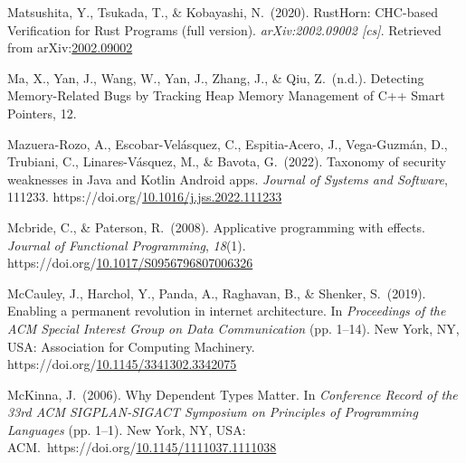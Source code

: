 \documentclass[12pt,twoside]{article}
\begin{document}
{\begin{thebibliography}{1079}
\mdbibitemlabel{}Matsushita, Y., Tsukada, T., \& Kobayashi, N.~(2020). RustHorn: CHC-based Verification for Rust Programs (full version). \emph{arXiv:2002.09002 {}[cs]}. Retrieved from arXiv:\href{http://arxiv.org/abs/2002.09002}{2002.09002}%

\mdbibitemlabel{}Ma, X., Yan, J., Wang, W., Yan, J., Zhang, J., \& Qiu, Z.~(n.d.). Detecting Memory-Related Bugs by Tracking Heap Memory Management of C++ Smart Pointers, 12.%

\mdbibitemlabel{}Mazuera-Rozo, A., Escobar-Velásquez, C., Espitia-Acero, J., Vega-Guzmán, D., Trubiani, C., Linares-Vásquez, M., \& Bavota, G.~(2022). Taxonomy of security weaknesses in Java and Kotlin Android apps. \emph{Journal of Systems and Software}, 111233. https://doi.org/\href{https://dx.doi.org/10.1016/j.jss.2022.111233}{10.1016/j.jss.2022.111233}%

\mdbibitemlabel{}Mcbride, C., \& Paterson, R.~(2008). Applicative programming with effects. \emph{Journal of Functional Programming}, \emph{18}(1). https://doi.org/\href{https://dx.doi.org/10.1017/S0956796807006326}{10.1017/S0956796807006326}%

\mdbibitemlabel{}McCauley, J., Harchol, Y., Panda, A., Raghavan, B., \& Shenker, S.~(2019). Enabling a permanent revolution in internet architecture. In \emph{Proceedings of the ACM Special Interest Group on Data Communication} (pp. 1–14). New York, NY, USA: Association for Computing Machinery. https://doi.org/\href{https://dx.doi.org/10.1145/3341302.3342075}{10.1145/3341302.3342075}%

\mdbibitemlabel{}McKinna, J.~(2006). Why Dependent Types Matter. In \emph{Conference Record of the 33rd ACM SIGPLAN-SIGACT Symposium on Principles of Programming Languages} (pp. 1–1). New York, NY, USA: ACM.~https://doi.org/\href{https://dx.doi.org/10.1145/1111037.1111038}{10.1145/1111037.1111038}%


\end{thebibliography}}
\end{document}
